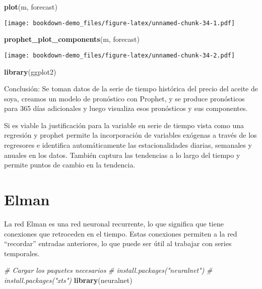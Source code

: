 \documentclass[
]{book}
\newenvironment{Shaded}{\begin{snugshade}}{\end{snugshade}}
\newcommand{\CommentTok}[1]{\textcolor[rgb]{0.56,0.35,0.01}{\textit{#1}}}
\newcommand{\FunctionTok}[1]{\textcolor[rgb]{0.13,0.29,0.53}{\textbf{#1}}}
\newcommand{\NormalTok}[1]{#1}
\begin{document}
\begin{Shaded}
\begin{Highlighting}[]
\FunctionTok{plot}\NormalTok{(m, forecast)}
\end{Highlighting}
\end{Shaded}

\texttt{[image: bookdown-demo\_files/figure-latex/unnamed-chunk-34-1.pdf]}

\begin{Shaded}
\begin{Highlighting}[]
\FunctionTok{prophet\_plot\_components}\NormalTok{(m, forecast)}
\end{Highlighting}
\end{Shaded}

\texttt{[image: bookdown-demo\_files/figure-latex/unnamed-chunk-34-2.pdf]}

\begin{Shaded}
\begin{Highlighting}[]
\FunctionTok{library}\NormalTok{(ggplot2)}
\end{Highlighting}
\end{Shaded}

Conclusión: Se toman datos de la serie de tiempo histórica del precio del aceite de soya, creamos un modelo de pronóstico con Prophet, y se produce pronósticos para 365 días adicionales y luego visualiza esos pronósticos y sus componentes.

Si es viable la justificación para la variable en serie de tiempo vista como una regresión y prophet permite la incorporación de variables exógenas a través de los regresores e identifica automáticamente las estacionalidades diarias, semanales y anuales en los datos. También captura las tendencias a lo largo del tiempo y permite puntos de cambio en la tendencia.

\hypertarget{elman}{%
\chapter{Elman}\label{elman}}

La red Elman es una red neuronal recurrente, lo que significa que tiene conexiones que retroceden en el tiempo. Estas conexiones permiten a la red ``recordar'' entradas anteriores, lo que puede ser útil al trabajar con series temporales.

\begin{Shaded}
\begin{Highlighting}[]
\CommentTok{\# Cargar los paquetes necesarios}
\CommentTok{\# install.packages("neuralnet")}
\CommentTok{\# install.packages("xts")}
\FunctionTok{library}\NormalTok{(neuralnet)}
\end{Highlighting}
\end{Shaded}
\end{document}
